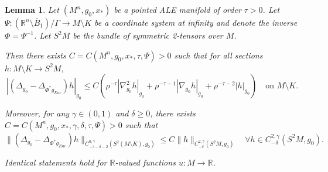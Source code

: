 \documentclass[12pt]{amsart}
\renewcommand{\1}{{\mathbf 1}}
\newcommand{\R}{{\mathbb R}}
\newtheorem{lemma}[thm]{Lemma}
\theoremstyle{others}
\numberwithin{equation}{section}
\begin{document}
\begin{lemma} \label{lemma: difference of Laplacians}
    Let $(M^n, g_0, x_*)$ be a pointed ALE manifold of order $\tau > 0$.
    Let $\Psi : ( \R^n \setminus \overline B_1) / \Gamma  \to M  \setminus K$ be a coordinate system at infinity and denote the inverse $\Phi  = \Psi^{-1}$.
    Let $S^2 M$ be the bundle of symmetric 2-tensors over $M $.

    Then there exists $C = C(M^n, g_0, x_*, \tau, \Psi) > 0$ such that for all sections $h: M \setminus K \to S^2 M,$
    \begin{equation} \label{eqn difference of Laplacians, pointwise est}
        | ( \Delta_{g_0} - \Delta_{\Phi^* g_{Euc}}) h |_{g_0} 
        \le C \left( \rho^{- \tau} |\nabla^2 _{g_0} h |_{g_0} + \rho^{- \tau-1} |\nabla _{g_0} h |_{g_0} + \rho^{- \tau-2} | h |_{g_0}  \right) 
        \quad \text{on }  M \setminus K.
    \end{equation}

    Moreover, for any $\gamma \in (0,1)$ and $\delta \ge 0$,
    there exists $C = C(M^n, g_0,x_*, \gamma, \delta, \tau, \Psi) > 0$ such that 
    \begin{equation} \label{eqn difference of Laplacians, Holder est}
        \| ( \Delta_{g_0} - \Delta_{\Phi^* g_{Euc}} ) h \|_{C^{0, \gamma}_{-\tau - \delta - 2} (S^2(M\setminus K ), g_0) } \le C \| h \|_{C^{2, \gamma}_{-\delta} (S^2M, g_0)}
        \quad \forall h \in C^{2, \gamma}_{-\delta}(S^2M , g_0). 
    \end{equation}

    Identical statements hold for $\R$-valued functions $u : M  \to \R$.
\end{lemma}
\end{document}
